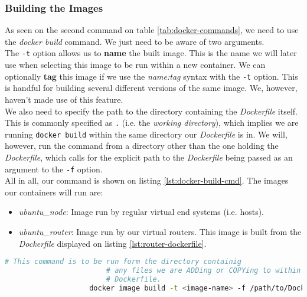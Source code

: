             \subsubsection{Building the Images}
                As seen on the second command on table \ref{tab:docker-commands}, we need to use the \textit{docker build} command. We just need to be aware of two arguments.\\

                The \texttt{-t} option allows us to \textbf{name} the built image. This is the name we will later use when selecting this image to be run within a new container. We can optionally \textbf{tag} this image if we use the \textit{name:tag} syntax with the \texttt{-t} option. This is handful for building several different versions of the same image. We, however, haven't made use of this feature.\\

                We also need to specify the path to the directory containing the \textit{Dockerfile} itself. This is commonly specified as \texttt{.} (i.e. the \textit{working directory}), which implies we are running \texttt{docker build} within the same directory our \textit{Dockerfile} is in. We will, however, run the command from a directory other than the one holding the \textit{Dockerfile}, which calls for the explicit path to the \textit{Dockerfile} being passed as an argument to the \texttt{-f} option.\\

                All in all, our command is shown on listing \ref{lst:docker-build-cmd}. The images our containers will run are:\\

                \begin{itemize}
                    \item \textit{ubuntu\_node}: Image run by regular virtual end systems (i.e. hosts).
                    \item \textit{ubuntu\_router}: Image run by our virtual routers. This image is built from the \textit{Dockerfile} displayed on listing \ref{lst:router-dockerfile}.
                \end{itemize}

                \begin{lstlisting}[language = bash, caption = Building an Image from a \textit{Dockerfile}., label = lst:docker-build-cmd]
                    # This command is to be run form the directory containig
                        # any files we are ADDing or COPYing to within the
                        # Dockerfile.
                    docker image build -t <image-name> -f /path/to/Dockerfile .
                \end{lstlisting}

